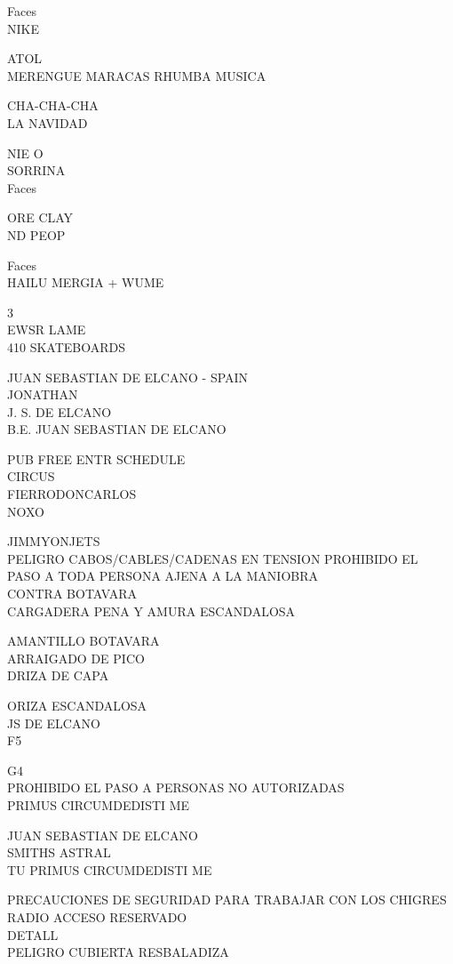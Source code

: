 \documentclass[10pt,letterpaper]{article}
\begin{document}
Faces\\
NIKE

ATOL\\
MERENGUE MARACAS RHUMBA MUSICA

CHA{-}CHA{-}CHA\\
LA NAVIDAD

NIE O\\
SORRINA\\
Faces

ORE CLAY\\
ND PEOP

Faces\\
HAILU MERGIA + WUME

3\\
EWSR LAME\\
410 SKATEBOARDS

JUAN SEBASTIAN DE ELCANO {-} SPAIN\\
JONATHAN\\
J. S. DE ELCANO\\
B.E. JUAN SEBASTIAN DE ELCANO

PUB FREE ENTR SCHEDULE\\
CIRCUS\\
FIERRODONCARLOS\\
NOXO

JIMMYONJETS\\
PELIGRO CABOS/CABLES/CADENAS EN TENSION PROHIBIDO EL PASO A TODA PERSONA AJENA A LA MANIOBRA\\
CONTRA BOTAVARA\\
CARGADERA PENA Y AMURA ESCANDALOSA

AMANTILLO BOTAVARA\\
ARRAIGADO DE PICO\\
DRIZA DE CAPA

ORIZA ESCANDALOSA\\
JS DE ELCANO\\
F5

G4\\
PROHIBIDO EL PASO A PERSONAS NO AUTORIZADAS\\
PRIMUS CIRCUMDEDISTI ME

JUAN SEBASTIAN DE ELCANO\\
SMITHS ASTRAL\\
TU PRIMUS CIRCUMDEDISTI ME

PRECAUCIONES DE SEGURIDAD PARA TRABAJAR CON LOS CHIGRES\\
RADIO ACCESO RESERVADO\\
DETALL\\
PELIGRO CUBIERTA RESBALADIZA
\end{document}
